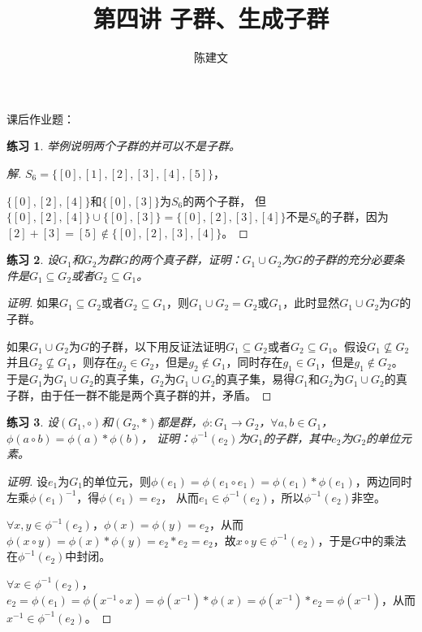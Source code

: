 \documentclass{article}
\newtheorem{Exercise}{练习}
\begin{document}
\begin{CJK*}{UTF8}{gbsn}
  \title{第四讲 子群、生成子群}
  \author{陈建文}
  \maketitle
  


课后作业题：
\begin{Exercise}
举例说明两个子群的并可以不是子群。
\end{Exercise}
\begin{proof}[解]
  $S_6=\{[0],[1],[2],[3],[4],[5]\}$，

  $\{[0],[2],[4]\}$和$\{[0],[3]\}$为$S_6$的两个子群，
  但$\{[0],[2],[4]\}\cup \{[0],[3]\}=\{[0],[2],[3],[4]\}$不是$S_6$的子群，因为$[2]+[3]=[5]\notin \{[0],[2],[3],[4]\}$。
\end{proof}
\begin{Exercise}
  设$G_1$和$G_2$为群$G$的两个真子群，证明：$G_1\cup G_2$为$G$的子群的充分必要条件是$G_1\subseteq G_2$或者$G_2\subseteq G_1$。
\end{Exercise}
\begin{proof}[证明]
  如果$G_1\subseteq G_2$或者$G_2\subseteq G_1$，则$G_1\cup G_2=G_2$或$G_1$，此时显然$G_1\cup G_2$为$G$的子群。

  如果$G_1\cup G_2$为$G$的子群，以下用反证法证明$G_1\subseteq G_2$或者$G_2\subseteq G_1$。假设$G_1\nsubseteq G_2$并且$G_2\nsubseteq G_1$，则存在$g_2\in G_2$，但是$g_2\notin G_1$，同时存在$g_1\in G_1$，但是$g_1\notin G_2$。
  于是$G_1$为$G_1\cup G_2$的真子集，$G_2$为$G_1\cup G_2$的真子集，易得$G_1$和$G_2$为$G_1\cup G_2$的真子群，由于任一群不能是两个真子群的并，矛盾。
\end{proof}
\begin{Exercise}
  设$(G_1,\circ)$和$(G_2,*)$都是群，$\phi:G_1\to G_2$，$\forall a,b\in G_1$，$\phi(a\circ b)=\phi(a)*\phi(b)$，
  证明：$\phi^{-1}(e_2)$为$G_1$的子群，其中$e_2$为$G_2$的单位元素。
\end{Exercise}
\begin{proof}[证明]
  设$e_1$为$G_1$的单位元，则$\phi(e_1)=\phi(e_1\circ e_1)=\phi(e_1)*\phi(e_1)$，两边同时左乘$\phi(e_1)^{-1}$，得$\phi(e_1)=e_2$，
  从而$e_1\in \phi^{-1}(e_2)$，所以$\phi^{-1}(e_2)$非空。

  $\forall x,y\in \phi^{-1}(e_2)$，$\phi(x)=\phi(y)=e_2$，从而$\phi(x\circ y)=\phi(x)*\phi(y)=e_2*e_2=e_2$，故$x\circ y\in \phi^{-1}(e_2)$，于是$G$中的乘法在$\phi^{-1}(e_2)$中封闭。

$\forall x\in \phi^{-1}(e_2)$，$e_2=\phi(e_1)=\phi(x^{-1}\circ x)=\phi(x^{-1})*\phi(x)=\phi(x^{-1})*e_2=\phi(x^{-1})$，从而$x^{-1}\in \phi^{-1}(e_2)$。


\end{proof}
\end{CJK*}
\end{document}
